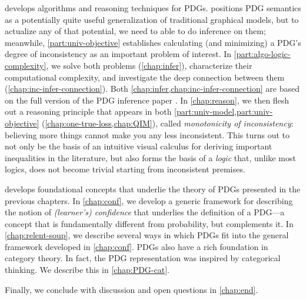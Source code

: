  develops algorithms and reasoning techniques for PDGs.
 positions PDG semantics as a potentially quite useful generalization of traditional graphical models, but to actualize any of that potential, we need to able to do inference on them;
meanwhile, 
\cref{part:univ-objective} establishes calculating (and minimizing) a PDG's degree of inconsistency as an important problem of interest. 
In \cref{part:algo-logic-complexity}, we solve both problems (\cref{chap:infer}), characterize their computational complexity, and investigate the deep connection between them (\cref{chap:inc-infer-connection}). 
Both \cref{chap:infer,chap:inc-infer-connection} are based on the full version of the PDG inference paper \citep*{pdg-infer}.
In \cref{chap:reason}, we then flesh out a
    reasoning principle that appears in both \cref{part:univ-model,part:univ-objective}
    (\cref{chap:one-true-loss,chap:QIM}),
    called \emph{monotonicity of inconsistency}: 
    believing more things cannot make you any less inconsistent. 
This turns out to not only be the basis of an intuitive visual calculus for deriving important inequalities in the literature, but also forms the basis of a \emph{logic} that, unlike most logics, does not become trivial starting from inconsistent premises.


 develops foundational concepts that underlie the theory of PDGs presented in the previous chapters. 
In \cref{chap:conf}, we develop a generic framework for describing the notion of \emph{(learner's) confidence} that underlies the definition of a PDG---a concept that is fundamentally different from probability, but complements it.
In \cref{chap:relent-soup}, we describe several ways in which PDGs fit into the general framework developed in \cref{chap:conf}.
PDGs also have a rich foundation in category theory.
In fact, the PDG representation was inspired by categorical thinking. 
We describe this in \cref{chap:PDG-cat}.
%

Finally, we conclude with discussion and open questions in \cref{chap:end}. 



